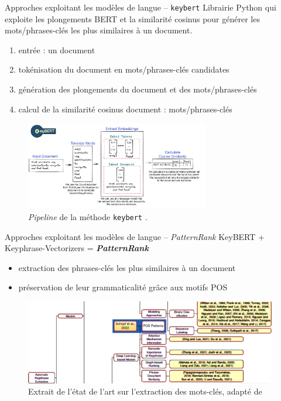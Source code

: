 \begin{frame}{Approches exploitant les modèles de langue -- \texttt{keybert}}
\justifying
Librairie Python qui exploite les plongements \textsc{BERT} et la similarité cosinus pour générer les mots/phrases-clés les plus similaires à un document.
\begin{enumerate}
\item entrée : un document
\item tokénisation du document en mots/phrases-clés candidates
\item génération des plongements du document et des mots/phrases-clés
\item calcul de la similarité cosinus document : mots/phrases-clés
\end{enumerate}
\begin{figure}
    \centering
    \includegraphics[width=80mm,scale=0.5]{pic/keybert.png}
    \caption{\textit{Pipeline} de la méthode \texttt{keybert} \citep{grootendorst2020keybert}.}
    \label{fig:enter-label}
\end{figure}
\end{frame}


\begin{frame}{Approches exploitant les modèles de langue -- \textit{PatternRank}}
Key\textsc{BERT} + Keyphrase-Vectorizers = \textit{\textbf{PatternRank}} \citep{schopf2022}
\begin{itemize}
\item extraction des phrases-clés les plus similaires à un document
\item préservation de leur grammaticalité grâce aux motifs POS
\end{itemize}
\begin{figure}
    \centering
    \includegraphics[width=110mm,scale=0.5]{pic/sota_lm_adapte.png}
    \caption{Extrait de l'état de l'art sur l'extraction des mots-clés, adapté de \citet{xie2023}}
    \label{fig:enter-label}
\end{figure}
\end{frame}

